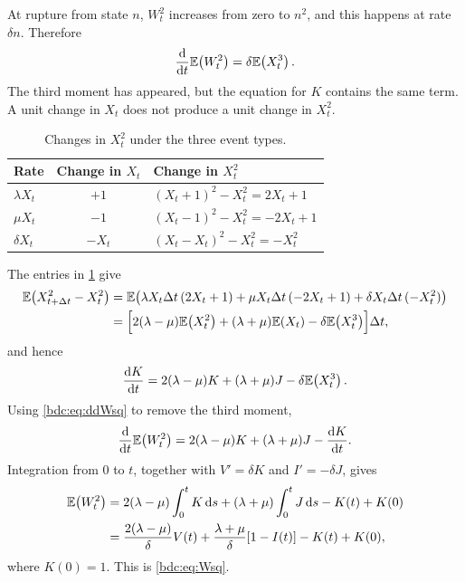 At rupture from state $n$, $W_t^2$ increases from zero to $n^2$, and this
happens at rate $\delta n$. Therefore
\begin{equation}
\label{bdc:eq:ddWsq}
\frac{\mathrm{d} }{\mathrm{d} t}\mathbb{E}\!\left(W_t^2\right)=\delta\mathbb{E}\!\left(X_t^3\right).
\end{equation}
The third moment has appeared, but the equation for $K$ contains the same term.
A unit change in $X_t$ does not produce a unit change in $X_t^2$.

\begin{table}[!htbp]
\centering
\caption{Changes in $X_t^2$ under the three event types.}
\label{bdc:tab:xsqchanges}
\begin{tabular}{lcl}
\toprule
Rate & Change in $X_t$ & Change in $X_t^2$\\
\midrule
$\lambda X_t$ & $+1$ & $(X_t+1)^2-X_t^2=2X_t+1$\\
$\mu X_t$ & $-1$ & $(X_t-1)^2-X_t^2=-2X_t+1$\\
$\delta X_t$ & $-X_t$ & $(X_t-X_t)^2-X_t^2=-X_t^2$\\
\bottomrule
\end{tabular}
\end{table}

The entries in \cref{bdc:tab:xsqchanges} give
\begin{align*}
\mathbb{E}\!\left(X_{t+\Delta t}^2-X_t^2\right)
&=\mathbb{E}\!\left(\lambda X_t\Delta t\,(2X_t+1)
+\mu X_t\Delta t\,(-2X_t+1)
+\delta X_t\Delta t\,(-X_t^2)\right)\\
&=\Bigl[2(\lambda-\mu)\mathbb{E}\!\left(X_t^2\right)
+(\lambda+\mu)\mathbb{E}\!\left(X_t\right)
-\delta\mathbb{E}\!\left(X_t^3\right)\Bigr]\Delta t,
\end{align*}
and hence
\begin{equation}
\label{bdc:eq:ddK}
\frac{\mathrm{d} K}{\mathrm{d} t}
=2(\lambda-\mu)K+(\lambda+\mu)J-\delta\mathbb{E}\!\left(X_t^3\right).
\end{equation}
Using \cref{bdc:eq:ddWsq} to remove the third moment,
\begin{equation}
\label{bdc:eq:dWsq}
\frac{\mathrm{d} }{\mathrm{d} t}\mathbb{E}\!\left(W_t^2\right)
=2(\lambda-\mu)K+(\lambda+\mu)J-\frac{\mathrm{d} K}{\mathrm{d} t}.
\end{equation}
Integration from $0$ to $t$, together with $V'=\delta K$ and
$I'=-\delta J$, gives
\begin{align*}
\mathbb{E}\!\left(W_t^2\right)
&=2(\lambda-\mu)\int_0^tK\,\mathrm{d} s
+(\lambda+\mu)\int_0^tJ\,\mathrm{d} s-K(t)+K(0)\\
&=\frac{2(\lambda-\mu)}{\delta}V(t)
+\frac{\lambda+\mu}{\delta}[1-I(t)]-K(t)+K(0),
\end{align*}
where $K(0)=1$. This is \cref{bdc:eq:Wsq}.

